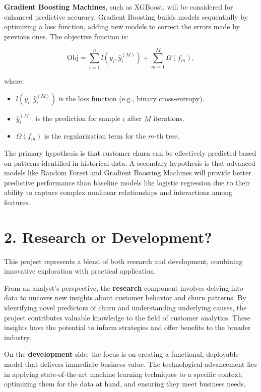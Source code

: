 \documentclass[12pt]{article}
\begin{document}
\textbf{Gradient Boosting Machines}, such as XGBoost, will be considered for enhanced predictive accuracy. Gradient Boosting builds models sequentially by optimizing a loss function, adding new models to correct the errors made by previous ones. The objective function is:

\[
\text{Obj} = \sum_{i=1}^{n} l(y_i, \hat{y}_i^{(M)}) + \sum_{m=1}^{M} \Omega(f_m),
\]

where:

\begin{itemize}
    \item \(l(y_i, \hat{y}_i^{(M)})\) is the loss function (e.g., binary cross-entropy).
    \item \(\hat{y}_i^{(M)}\) is the prediction for sample \(i\) after \(M\) iterations.
    \item \(\Omega(f_m)\) is the regularization term for the \(m\)-th tree.
\end{itemize}

The primary hypothesis is that customer churn can be effectively predicted based on patterns identified in historical data. A secondary hypothesis is that advanced models like Random Forest and Gradient Boosting Machines will provide better predictive performance than baseline models like logistic regression due to their ability to capture complex nonlinear relationships and interactions among features.

\section*{2. Research or Development?}

This project represents a blend of both research and development, combining innovative exploration with practical application.

From an analyst's perspective, the \textbf{research} component involves delving into data to uncover new insights about customer behavior and churn patterns. By identifying novel predictors of churn and understanding underlying causes, the project contributes valuable knowledge to the field of customer analytics. These insights have the potential to inform strategies and offer benefits to the broader industry.

On the \textbf{development} side, the focus is on creating a functional, deployable model that delivers immediate business value. The technological advancement lies in applying state-of-the-art machine learning techniques to a specific context, optimizing them for the data at hand, and ensuring they meet business needs.
\end{document}
